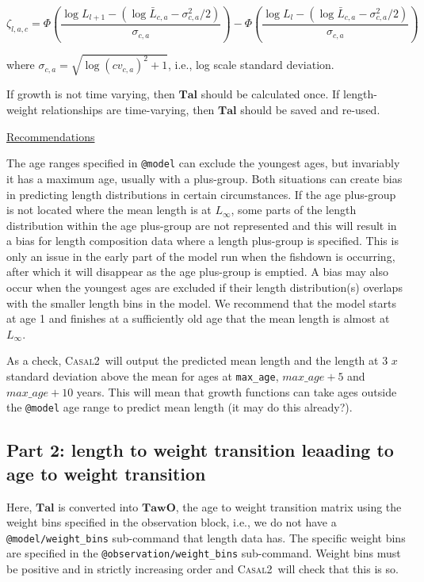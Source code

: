 \documentclass[a4paper,11pt,twoside,pdftex,draft]{article}
\newcommand{\CNAME}{\textsc{Casal2}}
\begin{document}
\begin{equation}
\zeta_{l,a,c} = \Phi\left( \frac{\log L_{l+1} - \left( \log\bar L_{c,a}  - \sigma_{c,a}^2/2 \right)}{\sigma_{c,a}} \right)   - \Phi\left( \frac{\log L_{l} - \left( \log\bar L_{c,a}  - \sigma_{c,a}^2/2 \right)}{\sigma_{c,a}} \right)
\end{equation}

where $\sigma_{c,a} = \sqrt{\log(cv_{c,a})^2 + 1}$, i.e., log scale standard deviation.


If growth is not time varying, then $\mathbf{Tal}$ should be calculated once. If length-weight relationships are time-varying, then $\mathbf{Tal}$ should be saved and re-used.

\bigskip
\underline{Recommendations}

The age ranges specified in \texttt{@model} can exclude the youngest ages, but invariably it has a maximum age, usually with a plus-group. Both situations can create bias in predicting length distributions in certain circumstances.  If the age plus-group is not located where the mean length is at $L_{\infty}$, some parts of the length distribution within the age plus-group are not represented and this will result in a bias for length composition data where a length plus-group is specified. This is only an issue in the early part of the model run when the fishdown is occurring, after which it will disappear as the age plus-group is emptied.  A bias may also occur when the youngest ages are excluded if their length distribution(s) overlaps with the smaller length bins in the model. We recommend that the model starts at age 1 and finishes at a sufficiently old age that the mean length is almost at $L_{\infty}$. 

As a check, \CNAME~will output the predicted mean length and the length at 3 $x$ standard deviation above the mean for ages at  \texttt{max\_age}, $max\_age + 5$ and $max\_age + 10$ years. This will mean that growth functions can take ages outside the \texttt{@model} age range to predict mean length (it may do this already?). 


\subsection{Part 2: length to weight transition leaading to age to weight transition}
Here, $\mathbf{Tal}$ is converted into $\mathbf{TawO}$, the age to weight transition matrix  using the weight bins specified in the observation block, i.e., we do not have a
\texttt{@model/weight\_bins} sub-command that length data has. The specific weight bins are specified in the \texttt{@observation/weight\_bins} sub-command.
 Weight bins must be positive and in strictly increasing order and \CNAME~will check that this is so.
\end{document}
